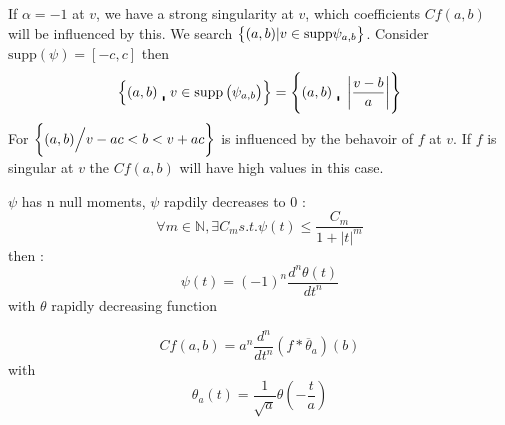 If $ \alpha = -1  $ at $ v  $, we have a strong singularity at $ v  $, which coefficients
$ Cf(a,b)  $ will be influenced by this. We search $ \set{ (a,b) | v \in \text{supp}
\psi_{a,b} }  $. Consider $ \text{supp} \left( \psi \right) = [-c, c]  $ then 
\[
    \set{ (a,b) \bracevert v \in \text{supp} \left( \psi_{a,b} \right)  } = \set{ (a,b)
    \bracevert \left | \frac{ v - b }{ a }  \right |  } 
\]
For $ \set{ (a,b) \Big / v - ac < b < v + ac  }  $ is influenced by the behavoir of $ f $
at $ v  $. If $ f $ is singular at $ v  $ the $ Cf(a,b)  $ will have high values in this
case. 

\begin{ftheo}[]
    $ \psi  $ has n null moments, $ \psi  $ rapdily decreases to 0 : 
    \[
        \forall m \in \mathbb{N}, \exists C_m s.t. \psi(t) \leq \frac{ C_m  }{ 1 + \left |
        t \right | ^m  } 
    \]  
    then : 
    \[
        \psi(t) = \left( -1\right) ^n \frac{ d^n\theta (t)  }{ dt^n  } 
    \] with $ \theta  $ rapidly decreasing function 

    \[
        Cf(a,b) = a^n \frac{ d^n  }{ dt^n  } \left( f * \overline{\theta}_a \right) (b) 
    \]
    with 
    \[
        \theta_a(t) = \frac{ 1 }{ \sqrt{a}  } \theta\left( -\frac{ t }{ a } \right) 
    \]
    \label{th:}
\end{ftheo}


